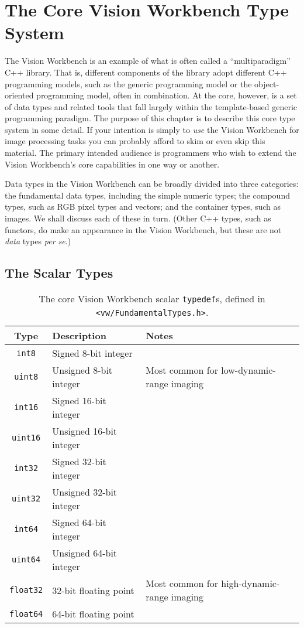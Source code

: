 \chapter{The Core Vision Workbench Type System}

The Vision Workbench is an example of what is often called a
``multiparadigm'' C++ library.  That is, different components of the
library adopt different C++ programming models, such as the generic
programming model or the object-oriented programming model, often in
combination.  At the core, however, is a set of data types and related
tools that fall largely within the template-based generic programming
paradigm.  The purpose of this chapter is to describe this core type
system in some detail.  If your intention is simply to {\it use} the
Vision Workbench for image processing tasks you can probably afford
to skim or even skip this material.  The primary intended audience is
programmers who wish to extend the Vision Workbench's core
capabilities in one way or another.

Data types in the Vision Workbench can be broadly divided into three
categories: the fundamental data types, including the simple numeric
types; the compound types, such as RGB pixel types and vectors; and
the container types, such as images.  We shall discuss each of these
in turn.  (Other C++ types, such as functors, do make an appearance in
the Vision Workbench, but these are not {\it data} types {\it per se}.)

\section{The Scalar Types}

\begin{table}[t]\begin{centering}
\begin{tabular}{|c|l|l|} \hline
Type & Description & Notes \\ \hline \hline
\verb#int8# & Signed 8-bit integer & \\ \hline
\verb#uint8# & Unsigned 8-bit integer & Most common for low-dynamic-range imaging \\ \hline
\verb#int16# & Signed 16-bit integer & \\ \hline
\verb#uint16# & Unsigned 16-bit integer & \\ \hline
\verb#int32# & Signed 32-bit integer & \\ \hline
\verb#uint32# & Unsigned 32-bit integer & \\ \hline
\verb#int64# & Signed 64-bit integer & \\ \hline
\verb#uint64# & Unsigned 64-bit integer & \\ \hline
\verb#float32# & 32-bit floating point & Most common for high-dynamic-range imaging \\ \hline
\verb#float64# & 64-bit floating point & \\ \hline
\end{tabular}
\caption{The core Vision Workbench scalar {\tt typedef}s, defined in {\tt <vw/FundamentalTypes.h>}.}
\label{tbl:scalar-types}
\end{centering}\end{table}

